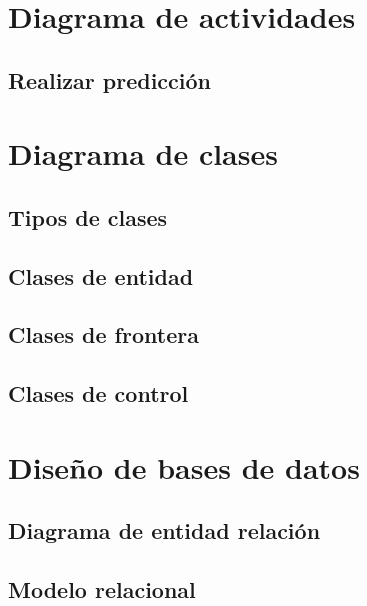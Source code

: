 \section{Diagrama de actividades}

\subsection{Realizar predicción}

\section{Diagrama de clases}

\subsection{Tipos de clases}

\subsection{Clases de entidad}

\subsection{Clases de frontera}

\subsection{Clases de control}

\section{Diseño de bases de datos}

\subsection{Diagrama de entidad relación}

\subsection{Modelo relacional}
